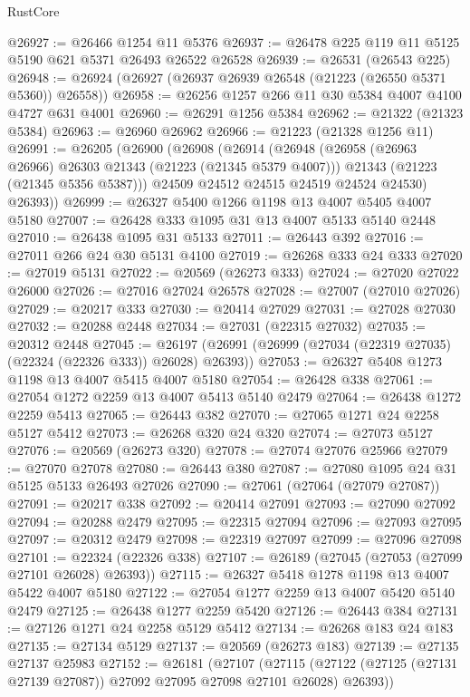 \begin{lexlean}{RustCore}
\begin{coremodule}
@26927 := @26466 @1254 @11 @5376
@26937 := @26478 @225 @119 @11 @5125 @5190 @621 @5371 @26493 @26522 @26528
@26939 := @26531 (@26543 @225)
@26948 := @26924 (@26927 (@26937 @26939 @26548 (@21223 (@26550 @5371 @5360)) @26558))
@26958 := @26256 @1257 @266 @11 @30 @5384 @4007 @4100 @4727 @631 @4001
@26960 := @26291 @1256 @5384
@26962 := @21322 (@21323 @5384)
@26963 := @26960 @26962
@26966 := @21223 (@21328 @1256 @11)
@26991 := @26205
    (@26900
      (@26908
        (@26914
          (@26948
            (@26958 (@26963 @26966) @26303 @21343 (@21223 (@21345 @5379 @4007)))
            @21343
            (@21223 (@21345 @5356 @5387)))
          @24509
          @24512
          @24515
          @24519
          @24524
          @24530)
        @26393))
@26999 := @26327 @5400 @1266 @1198 @13 @4007 @5405 @4007 @5180
@27007 := @26428 @333 @1095 @31 @13 @4007 @5133 @5140 @2448
@27010 := @26438 @1095 @31 @5133
@27011 := @26443 @392
@27016 := @27011 @266 @24 @30 @5131 @4100
@27019 := @26268 @333 @24 @333
@27020 := @27019 @5131
@27022 := @20569 (@26273 @333)
@27024 := @27020 @27022 @26000
@27026 := @27016 @27024 @26578
@27028 := @27007 (@27010 @27026)
@27029 := @20217 @333
@27030 := @20414 @27029
@27031 := @27028 @27030
@27032 := @20288 @2448
@27034 := @27031 (@22315 @27032)
@27035 := @20312 @2448
@27045 := @26197 (@26991 (@26999 (@27034 (@22319 @27035) (@22324 (@22326 @333)) @26028) @26393))
@27053 := @26327 @5408 @1273 @1198 @13 @4007 @5415 @4007 @5180
@27054 := @26428 @338
@27061 := @27054 @1272 @2259 @13 @4007 @5413 @5140 @2479
@27064 := @26438 @1272 @2259 @5413
@27065 := @26443 @382
@27070 := @27065 @1271 @24 @2258 @5127 @5412
@27073 := @26268 @320 @24 @320
@27074 := @27073 @5127
@27076 := @20569 (@26273 @320)
@27078 := @27074 @27076 @25966
@27079 := @27070 @27078
@27080 := @26443 @380
@27087 := @27080 @1095 @24 @31 @5125 @5133 @26493 @27026
@27090 := @27061 (@27064 (@27079 @27087))
@27091 := @20217 @338
@27092 := @20414 @27091
@27093 := @27090 @27092
@27094 := @20288 @2479
@27095 := @22315 @27094
@27096 := @27093 @27095
@27097 := @20312 @2479
@27098 := @22319 @27097
@27099 := @27096 @27098
@27101 := @22324 (@22326 @338)
@27107 := @26189 (@27045 (@27053 (@27099 @27101 @26028) @26393))
@27115 := @26327 @5418 @1278 @1198 @13 @4007 @5422 @4007 @5180
@27122 := @27054 @1277 @2259 @13 @4007 @5420 @5140 @2479
@27125 := @26438 @1277 @2259 @5420
@27126 := @26443 @384
@27131 := @27126 @1271 @24 @2258 @5129 @5412
@27134 := @26268 @183 @24 @183
@27135 := @27134 @5129
@27137 := @20569 (@26273 @183)
@27139 := @27135 @27137 @25983
@27152 := @26181
    (@27107
      (@27115 (@27122 (@27125 (@27131 @27139 @27087)) @27092 @27095 @27098 @27101 @26028) @26393))

\end{coremodule}
\end{lexlean}
